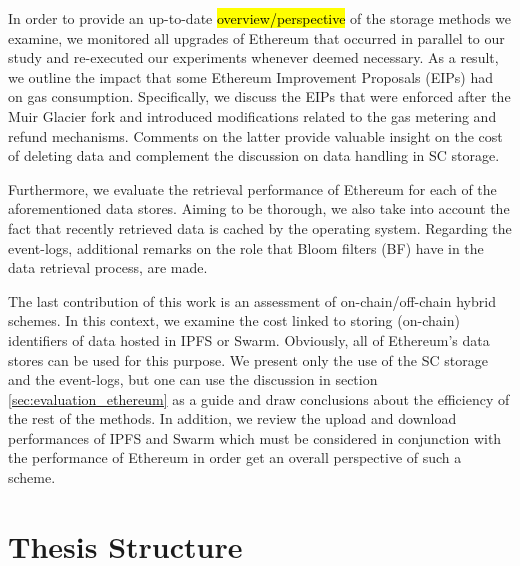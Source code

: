 In order to provide an up-to-date \hl{overview/perspective} of the storage methods we examine, we monitored all upgrades of Ethereum that occurred in parallel to our study and re-executed our experiments whenever deemed necessary. As a result, we outline the impact that some Ethereum Improvement Proposals (EIPs) had on gas consumption. Specifically, we discuss the EIPs that were enforced after the Muir Glacier fork and introduced modifications related to the gas metering and refund mechanisms. Comments on the latter provide valuable insight on the cost of deleting data and complement the discussion on data handling in SC storage.

Furthermore, we evaluate the retrieval performance of Ethereum for each of the aforementioned data stores. Aiming to be thorough, we also take into account the fact that recently retrieved data is cached by the operating system. Regarding the event-logs, additional remarks on the role that Bloom filters (BF) have in the data retrieval process, are made.

The last contribution of this work is an assessment of on-chain/off-chain hybrid schemes. In this context, we examine the cost linked to storing (on-chain) identifiers of data hosted in IPFS or Swarm. Obviously, all of Ethereum's data stores can be used for this purpose. We present only the use of the SC storage and the event-logs, but one can use the discussion in section \ref{sec:evaluation_ethereum} as a guide and draw conclusions about the efficiency of the rest of the methods. In addition, we review the upload and download performances of IPFS and Swarm which must be considered in conjunction with the performance of Ethereum in order get an overall perspective of such a scheme. 

\section{Thesis Structure}\label{sec:organization}
